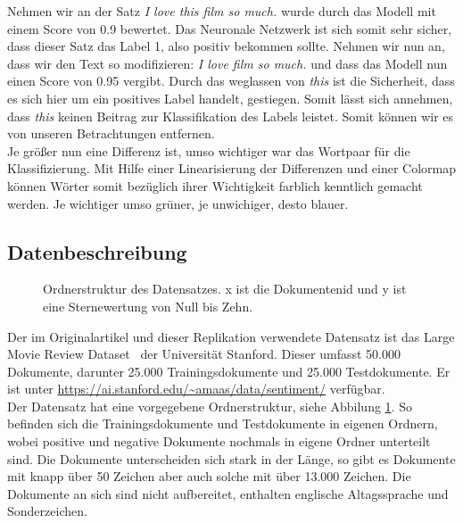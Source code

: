 \documentclass[DIV=13,fontsize=11pt]{scrartcl}
\begin{document}
Nehmen wir an der Satz \textit{I love this film so much.} wurde durch das Modell mit
einem Score von 0.9 bewertet. Das Neuronale Netzwerk ist sich somit sehr sicher,
dass dieser Satz das Label 1, also positiv bekommen sollte. Nehmen wir nun an,
dass wir den Text so modifizieren: \textit{I love film so much.} und dass das Modell
nun einen Score von 0.95 vergibt. Durch das weglassen von \textit{this} ist die
Sicherheit, dass es sich hier um ein positives Label handelt, gestiegen.
Somit lässt sich annehmen, dass \textit{this} keinen Beitrag zur Klassifikation
des Labels leistet. Somit können wir es von unseren Betrachtungen entfernen.\\

Je größer nun eine Differenz ist, umso wichtiger war das
Wortpaar für die Klassifizierung. Mit Hilfe einer Linearisierung der Differenzen
und einer Colormap können Wörter somit bezüglich ihrer Wichtigkeit
farblich kenntlich gemacht werden. Je wichtiger umso grüner, je unwichiger, desto blauer.

\subsection{Datenbeschreibung}

\begin{figure}[H]
    \centering
    \begin{minipage}{5cm}
    \end{minipage}
    \caption{Ordnerstruktur des Datensatzes. x ist die Dokumentenid und y ist eine Sternewertung von Null bis Zehn.}
    \label{fig:filestruc}
\end{figure}

Der im Originalartikel und dieser Replikation verwendete Datensatz ist das Large Movie
Review Dataset~\cite{maas-EtAl:2011:ACL-HLT2011} der Universität Stanford.
Dieser umfasst 50.000 Dokumente, darunter 25.000 Trainingsdokumente und 25.000 Testdokumente. Er ist unter
\url{https://ai.stanford.edu/~amaas/data/sentiment/} verfügbar.\\

Der Datensatz hat eine vorgegebene Ordnerstruktur, siehe Abbilung \ref{fig:filestruc}.
So befinden sich die Trainingsdokumente und Testdokumente in eigenen Ordnern,
wobei positive und negative Dokumente nochmals in eigene Ordner unterteilt sind.
Die Dokumente unterscheiden sich stark in der Länge, so gibt es Dokumente mit knapp über 50 Zeichen
aber auch solche mit über 13.000 Zeichen.
Die Dokumente an sich sind nicht aufbereitet, enthalten englische Altagssprache und Sonderzeichen.
\end{document}
